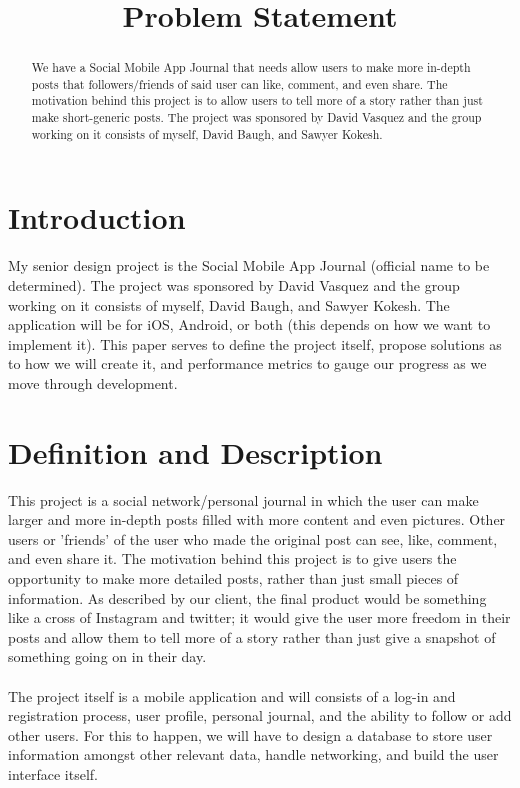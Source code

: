 \documentclass[letterpaper, 10, draftclsnofoot,onecolumn]{IEEEtran}
\begin{document}
\title{Problem Statement}
\author
{\IEEEauthorblockN{}
}

\maketitle

\begin{abstract}
\begin{center}
 We have a Social Mobile App Journal that needs allow users to make more in-depth posts that followers/friends of said user can like, comment, and even share. The motivation behind this project is to allow users to tell more of a story rather than just make short-generic posts. The project was sponsored by David Vasquez and the group working on it consists of myself, David Baugh, and Sawyer Kokesh.
\end{center}
\end{abstract}

\clearpage
\section*{Introduction} My senior design project is the Social Mobile App Journal (official name to be determined). The project was sponsored by David Vasquez and the group working on it consists of myself, David Baugh, and Sawyer Kokesh. The application will be for iOS, Android, or both (this depends on how we want to implement it). This paper serves to define the project itself, propose solutions as to how we will create it, and performance metrics to gauge our progress as we move through development. 
\section*{Definition and Description} This project is a social network/personal journal in which the user can make larger and more in-depth posts filled with more content and even pictures. Other users or 'friends' of the user who made the original post can see, like, comment, and even share it. The motivation behind this project is to give users the opportunity to make more detailed posts, rather than just small pieces of information. As described by our client, the final product would be something like a cross of Instagram and twitter; it would give the user more freedom in their posts and allow them to tell more of a story rather than just give a snapshot of something going on in their day.
\\ \\ 
\indent The project itself is a mobile application and will consists of a log-in and registration process, user profile, personal journal, and the ability to follow or add other users. For this to happen, we will have to design a database to store user information amongst other relevant data, handle networking, and build the user interface itself. 
\end{document}

